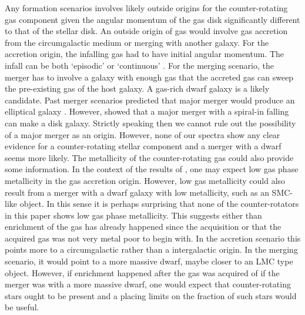 \documentclass[fleqn,usenatbib]{mnras}
\begin{document}
Any formation scenarios involves likely outside origins for the counter-rotating gas component given the angular momentum of the gas disk significantly different to 
that of the stellar disk.
An outside origin of gas would involve gas accretion from the circumgalactic medium or merging with another galaxy.
For the accretion origin, the infalling gas had to have initial angular momentum.
The infall can be both `episodic' or `continuous'
\citep{ThakarRyden1996,Thakar1997}.
For the merging scenario, the merger has to involve a galaxy with enough gas that
the accreted gas can sweep the pre-existing gas of the host galaxy. 
A gas-rich dwarf galaxy is a likely candidate. Past merger scenarios predicted
that major merger would produce an elliptical galaxy \citep{HernquistBernes1991}. 
However, \citet{Zeng2021} showed that a major merger with a spiral-in falling
can make a disk galaxy.  Strictly speaking then we cannot rule out the possibility of a major merger as an origin. However, none of our spectra show any clear evidence for a counter-rotating stellar component and a merger with a dwarf seems more likely. 
The metallicity of the counter-rotating gas could also provide some information.
In the context of the results of \citet{Kumari2021}, 
one may expect low gas phase metallicity  
in the gas accretion origin.
However, low gas metallicity could also result from a merger with 
a dwarf galaxy with low metallicity, such as an SMC-like object.
In this sense it is perhaps surprising that none of the counter-rotators in this paper shows low gas phase metallicity. This suggests either than enrichment of the gas has already happened since the acquisition or that the acquired gas was not very metal poor to begin with. In the accretion scenario this points more to a circumgalactic rather than a intergalactic origin. In the merging scenario, it would point to a more massive dwarf, maybe closer to an LMC type object. However, if enrichment happened after the gas was acquired of if the merger was with a more massive dwarf, one would expect that counter-rotating stars ought to be present and a placing limits on the fraction of such stars would be useful.
\end{document}

